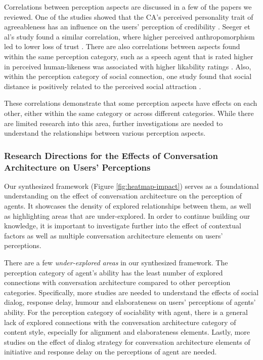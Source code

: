 Correlations between perception aspects are discussed in a few of the papers we reviewed. One of the studies showed that the CA's perceived personality trait of agreeableness has an influence on the users' perception of credibility \cite{andrews2012system}\cmt{[38]}. Seeger et al's study found a similar correlation, where higher perceived anthropomorphism led to lower loss of trust \cite{seeger2021chatbots}\cmt{[35]}. There are also correlations between aspects found within the same perception category, such as a speech agent that is rated higher in perceived human-likeness was associated with higher likability ratings \cite{zhu2022effects}\cmt{[26]}. Also, within the perception category of social connection, one study found that social distance is positively related to the perceived social attraction \cite{westerman2019believe}\cmt{[9]}.
 
These correlations demonstrate that some perception aspects have effects on each other, either within the same category or across different categories. While there are limited research into this area, further investigations are needed to understand the relationships between various perception aspects.


\subsubsection{Research Directions for the Effects of Conversation Architecture on Users' Perceptions}

Our synthesized framework (Figure \ref{fig:heatmap-impact}) serves as a foundational understanding on the effect of conversation architecture on the perception of agents. It showcases the density of explored relationships between them, as well as highlighting areas that are under-explored. In order to continue building our knowledge, it is important to investigate further into the effect of contextual factors as well as multiple conversation architecture elements on users' perceptions.

There are a few \textit{under-explored areas} in our synthesized framework. The perception category of agent's ability has the least number of explored connections with conversation architecture compared to other perception categories. Specifically, more studies are needed to understand the effects of social dialog, response delay, humour and elaborateness on users' perceptions of agents' ability. For the perception category of sociability with agent, there is a general lack of explored connections with the conversation architecture category of content style, especially for alignment and elaborateness elements. Lastly, more studies on the effect of dialog strategy for conversation architecture elements of initiative and response delay on the perceptions of agent are needed.

